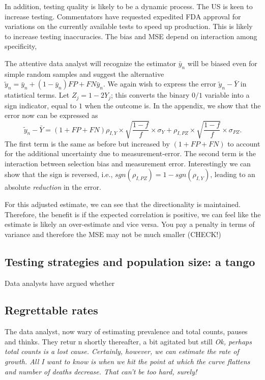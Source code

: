 \documentclass[12pt]{article}
\numberwithin{equation}{section}
\theoremstyle{plain}
\begin{document}
In addition, testing quality is likely to be a dynamic process.  The US is keen to increase testing.  Commentators have requested expedited FDA approval for variations on the currently available tests to speed up production.  This is likely to increase testing inaccuracies.  The bias and MSE depend on interaction among specificity,


The attentive data analyst will recognize the estimator $\bar y_n$ will be biased even for simple random samples and suggest the alternative $\tilde y_n = \bar y_n + (1-\bar y_n) FP + FN \bar y_n$. We again wish to express the error $\tilde  y_n - \bar Y$ in statistical terms.  Let $Z_j = 1 - 2Y_j$; this converts the binary $0/1$ variable into a sign indicator, equal to $1$ when the outcome is.  In the appendix, we show that the error now can be expressed as
$$
\tilde y_n - \bar Y = (1+FP+FN) \rho_{I,Y} \times \sqrt{\frac{1-f}{f}} \times \sigma_{Y} + \rho_{I,PZ} \times \sqrt{\frac{1-f}{f}} \times \sigma_{PZ}.
$$
The first term is the same as before but increased by $(1 + FP + FN)$ to account for the additional uncertainty due to measurement-error.  The second term is the interaction between selection bias and measurement error.  Interestingly we can show that the sign is reversed, i.e., $sgn(\rho_{I,PZ}) = 1 - sgn(\rho_{I,Y})$, leading to an absolute \emph{reduction} in the error.

For this adjusted estimate, we can see that the directionality is maintained.  Therefore, the benefit is if the expected correlation is positive, we can feel like the estimate is likely an over-estimate and vice versa.  You pay a penalty in terms of variance and therefore the MSE may not be much smaller (CHECK!)


\subsection{Testing strategies and population size: a tango}

Data analysts have argued whether

\subsection{Regrettable rates}

The data analyst, now wary of estimating prevalence and total counts, pauses and thinks.  They retur  n shortly thereafter, a bit agitated but still  \emph{Ok, perhaps total counts is a lost cause. Certainly, however, we can estimate the rate of growth.  All I want to know is when we hit the point at which the curve flattens and number of deaths decrease.  That can't be too hard, surely!}
\end{document}
